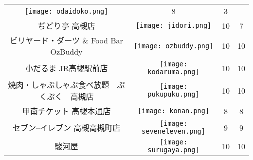 \begin{table}[t]
\begin{center}
\begin{tabular}{cc|cc}
\begin{minipage}{40mm}
          \texttt{[image: odaidoko.png]}
        \end{minipage} & 8 & 3 \\
        ぢどり亭 高槻店 & 
        \begin{minipage}{40mm}
          \centering
          \texttt{[image: jidori.png]}
        \end{minipage} & 10 & 7 \\
        ビリヤード・ダーツ \& Food Bar OzBuddy & 
        \begin{minipage}{40mm}
          \centering
          \texttt{[image: ozbuddy.png]}
        \end{minipage} & 10 & 10 \\
        小だるま JR高槻駅前店 &
        \begin{minipage}{40mm}
          \centering
          \texttt{[image: kodaruma.png]}
        \end{minipage} & 10 & 10 \\
        焼肉・しゃぶしゃぶ食べ放題　ぷくぷく　高槻店 & 
        \begin{minipage}{40mm}
          \centering
          \texttt{[image: pukupuku.png]}
        \end{minipage} & 10 & 10 \\
        甲南チケット 高槻本通店 & 
        \begin{minipage}{40mm}
          \centering
          \texttt{[image: konan.png]}
        \end{minipage} & 8 & 8 \\
        セブン--イレブン 高槻高槻町店 & 
        \begin{minipage}{40mm}
          \centering
          \texttt{[image: seveneleven.png]}
        \end{minipage} & 9 & 9 \\
        駿河屋 & 
        \begin{minipage}{40mm}
          \centering
          \texttt{[image: surugaya.png]}
        \end{minipage} & 10 & 10 \\
        \hline
      \end{tabular}
    \end{center}
  \end{table}
